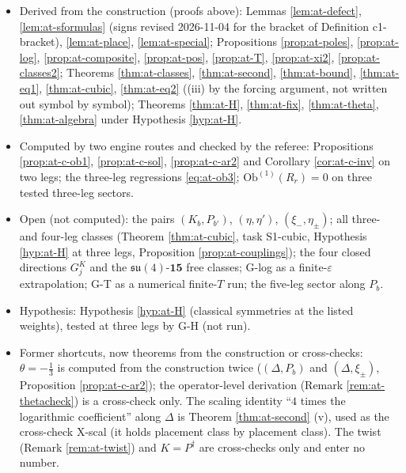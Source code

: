 \documentclass[11pt]{article}
\numberwithin{equation}{section}
\theoremstyle{plain}
\theoremstyle{definition}
\newcommand{\Ob}{\mathrm{Ob}}
\begin{document}
\begin{itemize}
\item Derived from the construction (proofs above): Lemmas \ref{lem:at-defect}, \ref{lem:at-sformulas} (signs revised 2026-11-04 for the bracket of Definition c1-bracket), \ref{lem:at-place}, \ref{lem:at-special}; Propositions \ref{prop:at-poles}, \ref{prop:at-log}, \ref{prop:at-composite}, \ref{prop:at-pos}, \ref{prop:at-T}, \ref{prop:at-xi2}, \ref{prop:at-classes2}; Theorems \ref{thm:at-classes}, \ref{thm:at-second}, \ref{thm:at-bound}, \ref{thm:at-eq1}, \ref{thm:at-cubic}, \ref{thm:at-eq2} ((iii) by the forcing argument, not written out symbol by symbol); Theorems \ref{thm:at-H}, \ref{thm:at-fix}, \ref{thm:at-theta}, \ref{thm:at-algebra} under Hypothesis \ref{hyp:at-H}.
\item Computed by two engine routes and checked by the referee: Propositions \ref{prop:at-c-ob1}, \ref{prop:at-c-sol}, \ref{prop:at-c-ar2} and Corollary \ref{cor:at-c-inv} on two legs; the three-leg regressions \eqref{eq:at-ob3}; $\Ob^{(1)}(R_r)=0$ on three tested three-leg sectors.
\item Open (not computed): the pairs $(K_b,P_{b'})$, $(\eta,\eta')$, $(\xi_-,\eta_\pm)$; all three- and four-leg classes (Theorem \ref{thm:at-cubic}, task S1-cubic, Hypothesis \ref{hyp:at-H} at three legs, Proposition \ref{prop:at-couplings}); the four closed directions $G^K_j$ and the $\mathfrak{su}(4)$-$\mathbf{15}$ free classes; G-log as a finite-$\varepsilon$ extrapolation; G-T as a numerical finite-$T$ run; the five-leg sector along $P_b$.
\item Hypothesis: Hypothesis \ref{hyp:at-H} (classical symmetries at the listed weights), tested at three legs by G-H (not run).
\item Former shortcuts, now theorems from the construction or cross-checks: $\theta=-\tfrac13$ is computed from the construction twice ($(\Delta,P_b)$ and $(\Delta,\xi_\pm)$, Proposition \ref{prop:at-c-ar2}); the operator-level derivation (Remark \ref{rem:at-thetacheck}) is a cross-check only. The scaling identity ``$4$ times the logarithmic coefficient'' along $\Delta$ is Theorem \ref{thm:at-second} (v), used as the cross-check X-scal (it holds placement class by placement class). The twist (Remark \ref{rem:at-twist}) and $K=P^\dagger$ are cross-checks only and enter no number.
\end{itemize}
\end{document}
